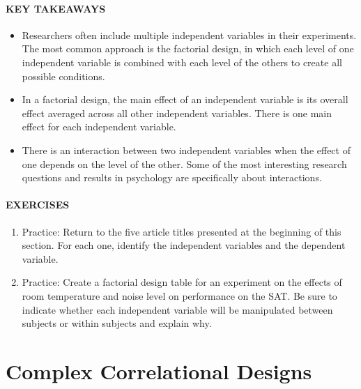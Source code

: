 \documentclass[
]{krantz}
\providecommand{\tightlist}{%
  \setlength{\itemsep}{0pt}\setlength{\parskip}{0pt}}
\begin{document}
\hypertarget{key-takeaways-20}{%
\paragraph*{KEY TAKEAWAYS}\label{key-takeaways-20}}

\begin{itemize}
\tightlist
\item
  Researchers often include multiple independent variables in their experiments. The most common approach is the factorial design, in which each level of one independent variable is combined with each level of the others to create all possible conditions.
\item
  In a factorial design, the main effect of an independent variable is its overall effect averaged across all other independent variables. There is one main effect for each independent variable.
\item
  There is an interaction between two independent variables when the effect of one depends on the level of the other. Some of the most interesting research questions and results in psychology are specifically about interactions.
\end{itemize}

\hypertarget{exercises-18}{%
\paragraph*{EXERCISES}\label{exercises-18}}

\begin{enumerate}
\def\labelenumi{\arabic{enumi}.}
\tightlist
\item
  Practice: Return to the five article titles presented at the beginning of this section. For each one, identify the independent variables and the dependent variable.
\item
  Practice: Create a factorial design table for an experiment on the effects of room temperature and noise level on performance on the SAT. Be sure to indicate whether each independent variable will be manipulated between subjects or within subjects and explain why.
\end{enumerate}

\hypertarget{complex-correlational-designs}{%
\section{Complex Correlational Designs}\label{complex-correlational-designs}}
\end{document}
